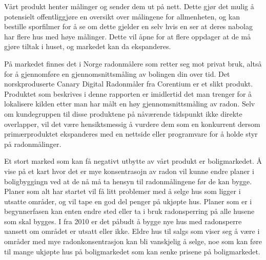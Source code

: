 Vårt produkt henter målinger og sender dem ut på nett. Dette gjør det mulig å potensielt offentliggjøre en oversikt over målingene for allmenheten, og kan bestille sporfilmer for å se om dette gjelder en selv hvis en ser at deres nabolag har flere hus med høye målinger. Dette vil åpne for at flere oppdager at de må gjøre tiltak i huset, og markedet kan da ekspanderes.

På markedet finnes det i Norge radonmålere som retter seg mot privat bruk, altså for å gjennomføre en gjennomsnittsmåling av bolingen din over tid. Det norskproduserte Canary Digital Radonmåler fra Corentium er et slikt produkt. Produktet som beskrives i denne rapporten er imidlertid det man trenger for å lokalisere kilden etter man har målt en høy gjennomsnittsmåling av radon. Selv om kundegruppen til disse produktene på nåværende tidspunkt ikke direkte overlapper, vil det være hensiktsmessig å vurdere dem som en konkurrent dersom primærproduktet ekspanderes med en nettside eller programvare for å holde styr på radonmålinger.

Et stort marked som kan få negativt utbytte av vårt produkt er boligmarkedet. Å vise på et kart hvor det er mye konsentrasojn av radon vil kunne endre planer i boligbyggingn ved at de nå må ta hensyn til radonmålingene før de kan bygge. Planer som alt har startet vil få litt problemer med å selge hus som ligger i utsatte områder, og vil tape en god del penger på ukjøpte hus. Planer som er i begynnerfasen kan enten endre sted eller ta i bruk radonsperring på alle husene som skal bygges. I fra 2010 er det påbudt å bygge nye hus med radonsperre uansett om området er utsatt eller ikke. Eldre hus til salgs som viser seg å være i områder med mye radonkonsentrasjon kan bli vanskjelig å selge, noe som kan føre til mange ukjøpte hus på boligmarkedet som kan senke prisene på boligmarkedet.
